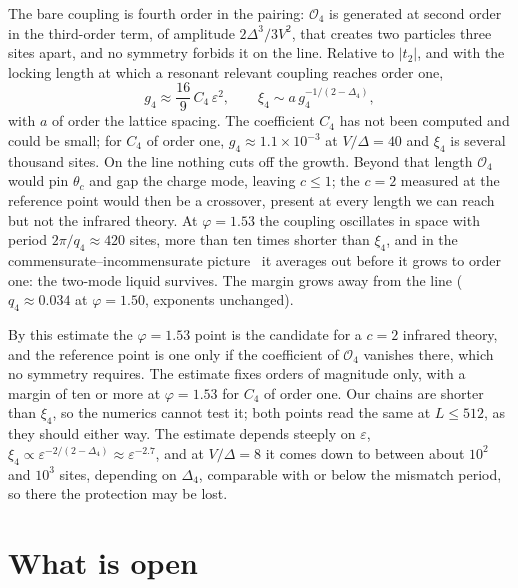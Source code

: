 \documentclass[11pt]{article}
\begin{document}
The bare coupling is fourth order in the pairing: $\mathcal O_4$ is generated at second order in the third-order term, of amplitude $2\Delta^3/3V^2$, that creates two particles three sites apart, and no symmetry forbids it on the line. Relative to $|t_2|$, and with the locking length at which a resonant relevant coupling reaches order one,
\begin{equation}
g_4\approx\frac{16}{9}\,C_4\,\varepsilon^2,\qquad \xi_4\sim a\,g_4^{-1/(2-\Delta_4)},
\label{eq:xi4}
\end{equation}
with $a$ of order the lattice spacing. The coefficient $C_4$ has not been computed and could be small; for $C_4$ of order one, $g_4\approx1.1\times10^{-3}$ at $V/\Delta=40$ and $\xi_4$ is several thousand sites. On the line nothing cuts off the growth. Beyond that length $\mathcal O_4$ would pin $\theta_c$ and gap the charge mode, leaving $c\le1$; the $c=2$ measured at the reference point would then be a crossover, present at every length we can reach but not the infrared theory. At $\varphi=1.53$ the coupling oscillates in space with period $2\pi/q_4\approx420$ sites, more than ten times shorter than $\xi_4$, and in the commensurate--incommensurate picture~\cite{PT,Giamarchi} it averages out before it grows to order one: the two-mode liquid survives. The margin grows away from the line ($q_4\approx0.034$ at $\varphi=1.50$, exponents unchanged).

By this estimate the $\varphi=1.53$ point is the candidate for a $c=2$ infrared theory, and the reference point is one only if the coefficient of $\mathcal O_4$ vanishes there, which no symmetry requires. The estimate fixes orders of magnitude only, with a margin of ten or more at $\varphi=1.53$ for $C_4$ of order one. Our chains are shorter than $\xi_4$, so the numerics cannot test it; both points read the same at $L\le512$, as they should either way. The estimate depends steeply on $\varepsilon$, $\xi_4\propto\varepsilon^{-2/(2-\Delta_4)}\approx\varepsilon^{-2.7}$, and at $V/\Delta=8$ it comes down to between about $10^2$ and $10^3$ sites, depending on $\Delta_4$, comparable with or below the mismatch period, so there the protection may be lost.

\section{What is open}
\end{document}
